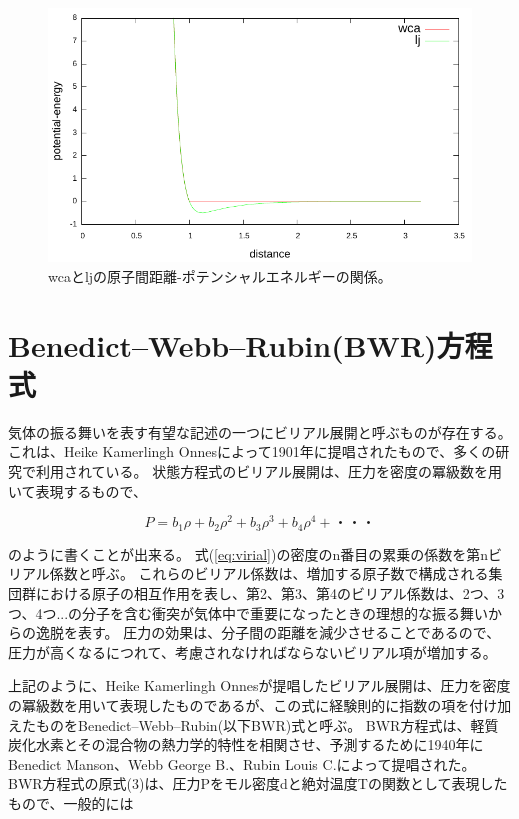 \documentclass[titlepage]{jsreport}
\begin{document}
\begin{figure}[htbp]
    \begin{center}
        \includegraphics[width=15cm]{fig/dis-poen.pdf}
    \end{center}
    \caption{wcaとljの原子間距離-ポテンシャルエネルギーの関係。}
    \label{fig:dis-poen}
\end{figure}

\section{Benedict–Webb–Rubin(BWR)方程式}
気体の振る舞いを表す有望な記述の一つにビリアル展開と呼ぶものが存在する。
これは、Heike Kamerlingh Onnesによって1901年に提唱されたもので\cite{virial-Heike}、多くの研究で利用されている。
状態方程式のビリアル展開は、圧力を密度の冪級数を用いて表現するもので、

\large
\begin{equation}
P=b_1{\rho}+b_2{\rho}^2+b_3{\rho}^3+b_4{\rho}^4+ ・・・ \label{eq:virial}
\end{equation}

\normalsize
のように書くことが出来る。
式(\ref{eq:virial})の密度のn番目の累乗の係数を第nビリアル係数と呼ぶ\cite{virial-expansion}。
これらのビリアル係数は、増加する原子数で構成される集団群における原子の相互作用を表し、第2、第3、第4のビリアル係数は、2つ、3つ、4つ...の分子を含む衝突が気体中で重要になったときの理想的な振る舞いからの逸脱を表す。
圧力の効果は、分子間の距離を減少させることであるので、圧力が高くなるにつれて、考慮されなければならないビリアル項が増加する\cite{virial-Heike}。

上記のように、Heike Kamerlingh Onnesが提唱したビリアル展開は、圧力を密度の冪級数を用いて表現したものであるが、この式に経験則的に指数の項を付け加えたものをBenedict–Webb–Rubin(以下BWR)式と呼ぶ。
BWR方程式は、軽質炭化水素とその混合物の熱力学的特性を相関させ、予測するために1940年にBenedict Manson、Webb George B.、Rubin Louis C.によって提唱された\cite{BWR-equation:original}。
BWR方程式の原式(3)は、圧力Pをモル密度dと絶対温度Tの関数として表現したもので、一般的には
\end{document}
